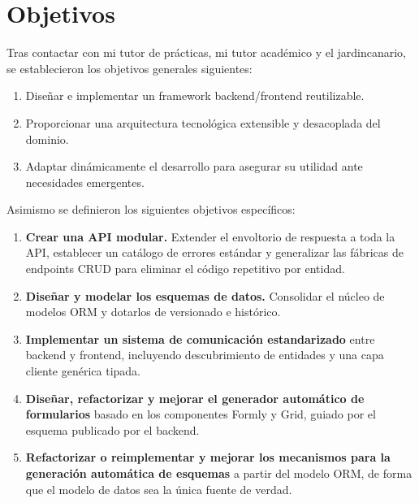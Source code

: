 \section{Objetivos}
Tras contactar con mi tutor de prácticas, mi tutor académico y el
\gls{jardincanario}, se establecieron los objetivos generales siguientes:
\begin{enumerate}
    \item Diseñar e implementar un framework backend/frontend reutilizable.
    \item Proporcionar una arquitectura tecnológica extensible y desacoplada
    del dominio.
    \item Adaptar dinámicamente el desarrollo para asegurar su utilidad ante
    necesidades emergentes.
\end{enumerate}
Asimismo se definieron los siguientes objetivos específicos:
\begin{enumerate}
    \item \textbf{Crear una API modular.} Extender el envoltorio de
    respuesta a toda la API, establecer un catálogo de errores estándar y
    generalizar las fábricas de endpoints CRUD para eliminar el código
    repetitivo por entidad.
    \item \textbf{Diseñar y modelar los esquemas de datos.} Consolidar el
    núcleo de modelos ORM y dotarlos de versionado e histórico.
    \item \textbf{Implementar un sistema de comunicación estandarizado} entre
    backend y frontend, incluyendo descubrimiento de entidades y una capa
    cliente genérica tipada.
    \item \textbf{Diseñar, refactorizar y mejorar el generador automático de
    formularios} basado en los componentes Formly y Grid, guiado por el
    esquema publicado por el backend.
    \item \textbf{Refactorizar o reimplementar y mejorar los mecanismos para
    la generación automática de esquemas} a partir del modelo ORM, de forma
    que el modelo de datos sea la única fuente de verdad.
\end{enumerate}

